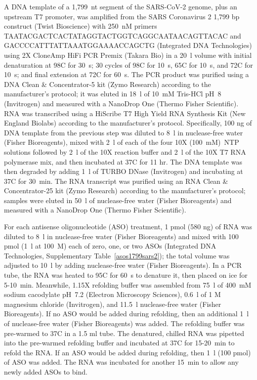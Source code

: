 \documentclass[main.tex]{subfiles}
\begin{document}
A DNA template of a 1,799~nt segment of the SARS-CoV-2 genome, plus an upstream T7 promoter, was amplified from the SARS Coronavirus 2 1,799 bp construct (Twist Bioscience) with 250~nM primers TAATACGACTCACTATAGGTACTGGTCAGGCAATAACAGTTACAC and GACCCCATTTATTAAATGGAAAACCAGCTG (Integrated DNA Technologies) using 2X CloneAmp HiFi PCR Premix (Takara Bio) in a 20~\textmu l volume with initial denaturation at 98\textdegree C for 30~s; 30 cycles of 98\textdegree C for 10~s, 65\textdegree C for 10~s, and 72\textdegree C for 10~s; and final extension at 72\textdegree C for 60~s.
The PCR product was purified using a DNA Clean \& Concentrator-5 kit (Zymo Research) according to the manufacturer's protocol; it was eluted in 18~\textmu l of 10~mM Tris-HCl pH~8 (Invitrogen) and measured with a NanoDrop One (Thermo Fisher Scientific).
RNA was transcribed using a HiScribe T7 High Yield RNA Synthesis Kit (New England Biolabs) according to the manufacturer's protocol.
Specifically, 100 ng of DNA template from the previous step was diluted to 8~\textmu l in nuclease-free water (Fisher Bioreagents), mixed with 2~\textmu l of each of the four 10X (100~mM)~NTP solutions followed by 2~\textmu l of the 10X reaction buffer and 2~\textmu l of the 10X T7 RNA polymerase mix, and then incubated at 37\textdegree C for 11 hr.
The DNA template was then degraded by adding 1~\textmu l of TURBO DNase (Invitrogen) and incubating at 37\textdegree C for 30~min.
The RNA transcript was purified using an RNA Clean \& Concentrator-25 kit (Zymo Research) according to the manufacturer's protocol; samples were eluted in 50~\textmu l of nuclease-free water (Fisher Bioreagents) and measured with a NanoDrop One (Thermo Fisher Scientific).

For each antisense oligonucleotide (ASO) treatment, 1 pmol (580 ng) of RNA was diluted to 8~\textmu l in nuclease-free water (Fisher Bioreagents) and mixed with 100 pmol (1~\textmu l at 100~\textmu M) each of zero, one, or two ASOs (Integrated DNA Technologies, Supplementary Table~\ref{asos1799sars2}); the total volume was adjusted to 10~\textmu l by adding nuclease-free water (Fisher Bioreagents).
In a PCR tube, the RNA was heated to 95\textdegree C for 60~s to denature it, then placed on ice for 5-10~min.
Meanwhile, 1.15X refolding buffer was assembled from 75~\textmu l of 400~mM sodium cacodylate pH~7.2 (Electron Microscopy Sciences), 0.6~\textmu l of 1 M magnesium chloride (Invitrogen), and 11.5~\textmu l nuclease-free water (Fisher Bioreagents).
If no ASO would be added during refolding, then an additional 1~\textmu l of nuclease-free water (Fisher Bioreagents) was added.
The refolding buffer was pre-warmed to 37\textdegree C in a 1.5 ml tube.
The denatured, chilled RNA was pipetted into the pre-warmed refolding buffer and incubated at 37\textdegree C for 15-20~min to refold the RNA.
If an ASO would be added during refolding, then 1~\textmu l (100 pmol) of ASO was added.
The RNA was incubated for another 15~min to allow any newly added ASOs to bind.
\end{document}
